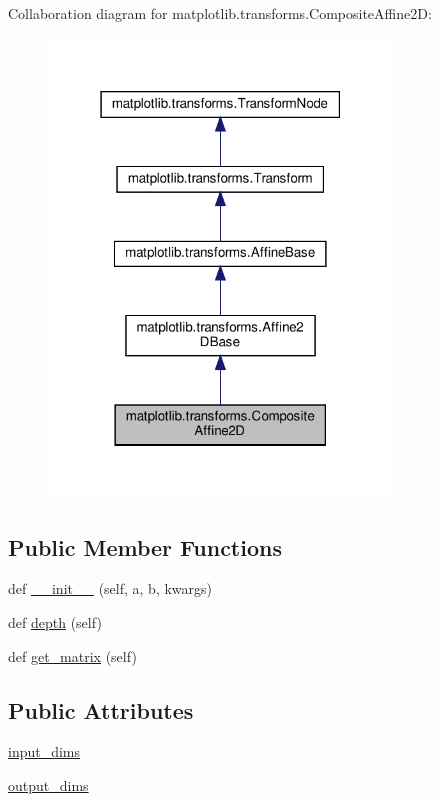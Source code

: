 Collaboration diagram for matplotlib.\+transforms.\+Composite\+Affine2D\+:
\nopagebreak
\begin{figure}[H]
\begin{center}
\leavevmode
\includegraphics[width=259pt]{classmatplotlib_1_1transforms_1_1CompositeAffine2D__coll__graph}
\end{center}
\end{figure}
\subsection*{Public Member Functions}
\begin{DoxyCompactItemize}
\item 
def \hyperlink{classmatplotlib_1_1transforms_1_1CompositeAffine2D_a0ab5137c9be148dbe6c6399b85ab49ce}{\+\_\+\+\_\+init\+\_\+\+\_\+} (self, a, b, kwargs)
\item 
def \hyperlink{classmatplotlib_1_1transforms_1_1CompositeAffine2D_af5fe01b5684e9047f325b78c6cf197f4}{depth} (self)
\item 
def \hyperlink{classmatplotlib_1_1transforms_1_1CompositeAffine2D_a72c8eae938e6ff15c7d3874bb03a31d1}{get\+\_\+matrix} (self)
\end{DoxyCompactItemize}
\subsection*{Public Attributes}
\begin{DoxyCompactItemize}
\item 
\hyperlink{classmatplotlib_1_1transforms_1_1CompositeAffine2D_adce3dc3282566faaed639c9fc84c32d3}{input\+\_\+dims}
\item 
\hyperlink{classmatplotlib_1_1transforms_1_1CompositeAffine2D_a79a176338d6502885484c930173c67a8}{output\+\_\+dims}
\end{DoxyCompactItemize}
